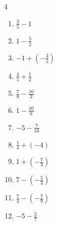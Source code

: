 \begin{multicols}{4}
\begin{enumerate}
  \item $\displaystyle \frac{2}{5} - 1$


  \item $\displaystyle 1 - \frac{5}{2}$


  \item $\displaystyle -1 + \left(-\frac{3}{5}\right)$


  \item $\displaystyle \frac{4}{5} + \frac{1}{2}$


  \item $\displaystyle \frac{7}{8} - \frac{10}{3}$


  \item $\displaystyle 1 - \frac{10}{9}$


  \item $\displaystyle -5 - \frac{7}{10}$


  \item $\displaystyle \frac{1}{4} + \left(-4\right)$


  \item $\displaystyle 1 + \left(-\frac{7}{3}\right)$


  \item $\displaystyle 7 - \left(-\frac{5}{3}\right)$


\columnbreak %

\resetques

  \item $\displaystyle \frac{7}{4} - \left(-\frac{7}{9}\right)$


  \item $\displaystyle -5 - \frac{2}{7}$


\end{enumerate}
\end{multicols}
